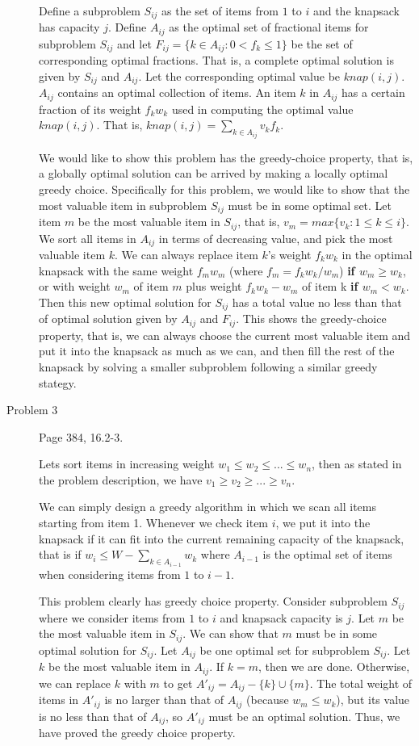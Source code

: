 \documentclass[11pt]{article}
\begin{document}
\begin{description}
Define a subproblem $S_{ij}$ as the set of items from $1$ to $i$ and the knapsack has capacity $j$.
Define $A_{ij}$ as the optimal set of fractional items for subproblem $S_{ij}$ and let
$F_{ij}=\{k\in A_{ij}: 0 < f_k \le 1 \}$ be the set of corresponding optimal fractions. That is, a
complete optimal solution is given by $S_{ij}$ and $A_{ij}$. Let the corresponding optimal value be
$knap(i,j)$. $A_{ij}$ contains an optimal collection of items. An item $k$ in $A_{ij}$ has a
certain fraction of its weight $f_k w_k$ used in computing the optimal value $knap(i,j)$. That is,
$knap(i,j)=\sum_{k\in A_{ij}} v_k f_k$.

We would like to show this problem has the greedy-choice property, that is, a globally optimal
solution can be arrived by making a locally optimal greedy choice. Specifically for this problem,
we would like to show that the most valuable item in subproblem $S_{ij}$ must be in some optimal
set. Let item $m$ be the most valuable item in $S_{ij}$, that is, $v_m=max\{v_k: 1\le k \le i\}$.
We sort all items in $A_{ij}$ in terms of decreasing value, and pick the most valuable item $k$.
We can always replace item $k$'s weight $f_k w_k$ in the optimal knapsack with the same weight $f_m
w_m$ (where $f_m=f_k w_k / w_m$) \textbf{if $w_m\ge w_k$}, or with weight $w_m$ of item $m$ plus
weight $f_k w_k - w_m$ of item k \textbf{if $w_m< w_k$}. Then this new optimal solution for
$S_{ij}$ has a total value no less than that of optimal solution given by $A_{ij}$ and $F_{ij}$.
This shows the greedy-choice property, that is, we can always choose the current most valuable item
and put it into the knapsack as much as we can, and then fill the rest of the knapsack by solving a
smaller subproblem following a similar greedy stategy.


\item[Problem 3] Page 384, 16.2-3.

Lets sort items in increasing weight $w_1 \le w_2 \le ... \le w_n$, then as stated in the problem
description, we have $v_1 \ge v_2 \ge ... \ge v_n$.

We can simply design a greedy algorithm in which we scan all items starting from item 1. Whenever
we check item $i$, we put it into the knapsack if it can fit into the current remaining capacity of
the knapsack, that is if $w_i \le W-\sum_{k\in A_{i-1}} w_k$ where $A_{i-1}$ is the optimal set of
items when considering items from $1$ to $i-1$.

This problem clearly has greedy choice property. Consider subproblem $S_{ij}$ where we consider
items from $1$ to $i$ and knapsack capacity is $j$. Let $m$ be the most valuable item in $S_{ij}$.
We can show that $m$ must be in some optimal solution for $S_{ij}$. Let $A_{ij}$ be one optimal set
for subproblem $S_{ij}$. Let $k$ be the most valuable item in $A_{ij}$. If $k=m$, then we are done.
Otherwise, we can replace $k$ with $m$ to get $A'_{ij}=A_{ij}-\{k\}\cup \{m\}$. The total weight of
items in $A'_{ij}$ is no larger than that of $A_{ij}$ (because $w_m\le w_k$), but its value is no
less than that of $A_{ij}$, so $A'_{ij}$ must be an optimal solution. Thus, we have proved the
greedy choice property.


\end{description}
\end{document}
